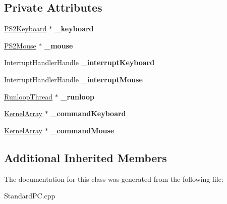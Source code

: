 \subsection*{Private Attributes}
\begin{DoxyCompactItemize}
\item 
\mbox{\label{class_standard_p_c___internal_1_1_p_s2_controller_a686f36507713d39d0de843fec42660b2}} 
\hyperlink{class_standard_p_c___internal_1_1_p_s2_keyboard}{P\+S2\+Keyboard} $\ast$ {\bfseries \+\_\+keyboard}
\item 
\mbox{\label{class_standard_p_c___internal_1_1_p_s2_controller_adf46e88314a96ad4d84968fe23175831}} 
\hyperlink{class_standard_p_c___internal_1_1_p_s2_mouse}{P\+S2\+Mouse} $\ast$ {\bfseries \+\_\+mouse}
\item 
\mbox{\label{class_standard_p_c___internal_1_1_p_s2_controller_a6179d4f16c628287bd3c1cc56a1de5f7}} 
Interrupt\+Handler\+Handle {\bfseries \+\_\+interrupt\+Keyboard}
\item 
\mbox{\label{class_standard_p_c___internal_1_1_p_s2_controller_a8baef8f1c54735d9d7bbe41bdd609af3}} 
Interrupt\+Handler\+Handle {\bfseries \+\_\+interrupt\+Mouse}
\item 
\mbox{\label{class_standard_p_c___internal_1_1_p_s2_controller_ace5db428b131d16cccc3ffb5da07f4cb}} 
\hyperlink{class_runloop_thread}{Runloop\+Thread} $\ast$ {\bfseries \+\_\+runloop}
\item 
\mbox{\label{class_standard_p_c___internal_1_1_p_s2_controller_afd45cba9d660119902184e7720205fde}} 
\hyperlink{class_kernel_array}{Kernel\+Array} $\ast$ {\bfseries \+\_\+command\+Keyboard}
\item 
\mbox{\label{class_standard_p_c___internal_1_1_p_s2_controller_a831f7f19cad7cbbe3249c9e137c215af}} 
\hyperlink{class_kernel_array}{Kernel\+Array} $\ast$ {\bfseries \+\_\+command\+Mouse}
\end{DoxyCompactItemize}
\subsection*{Additional Inherited Members}


The documentation for this class was generated from the following file\+:\begin{DoxyCompactItemize}
\item 
Standard\+P\+C.\+cpp\end{DoxyCompactItemize}
